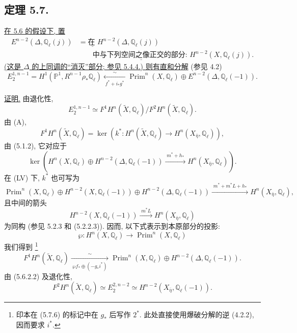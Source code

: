 \subsection*{定理 5.7.}
\underline{在 5.6 的假设下, 置}
\[
\begin{aligned}
E^{n-2}(\Delta,\mathbb Q_\ell(j))
&=\underline{\text{在 }}
H^{n-2}(\Delta,\mathbb Q_\ell(j))\\
&\qquad\underline{\text{中与下列空间之像正交的部分: }}
H^{n-2}(X,\mathbb Q_\ell(j)).
\end{aligned}
\]
\underline{(这是 $\Delta$ 的上同调的\textquotedblleft 消灭\textquotedblright{}部分; 参见 5.4.4.) 则有直和分解} (参见 4.2)
\begin{equation}\tag{5.7.1}
E_2^{1,n-1}
=H^1(\mathbb P^1,R^{n-1}\rho_*\mathbb Q_\ell)
\xleftarrow[\;f^*+i_*g^*\;]{\sim}
\operatorname{Prim}^n(X,\mathbb Q_\ell)
\oplus E^{n-2}(\Delta,\mathbb Q_\ell(-1)).
\end{equation}

\underline{证明.}
由退化性,
\[
E_2^{1,n-1}\simeq
F^1H^n(\widetilde X,\mathbb Q_\ell)
\big/F^2H^n(\widetilde X,\mathbb Q_\ell).
\]
由 (A),
\begin{equation}\tag{5.7.2}
F^1H^n(\widetilde X,\mathbb Q_\ell)
=\ker\!\left(
k^*:H^n(\widetilde X,\mathbb Q_\ell)\longrightarrow
H^n(X_{\bar\eta},\mathbb Q_\ell)
\right),
\end{equation}
由 (5.1.2), 它对应于
\[
\ker\!\left(
H^n(X,\mathbb Q_\ell)
\oplus H^{n-2}(\Delta,\mathbb Q_\ell(-1))
\xrightarrow{\;m^*+h_*\;}
H^n(X_{\bar\eta},\mathbb Q_\ell)
\right).
\]
在 (LV) 下, $k^*$ 也可写为
\begin{equation}\tag{5.7.3}
\operatorname{Prim}^n(X,\mathbb Q_\ell)
\oplus H^{n-2}(X,\mathbb Q_\ell(-1))
\oplus H^{n-2}(\Delta,\mathbb Q_\ell(-1))
\xrightarrow{\;m^*+m^*L+h_*\;}
H^n(X_{\bar\eta},\mathbb Q_\ell),
\end{equation}
且中间的箭头
\begin{equation}\tag{5.7.4}
H^{n-2}(X,\mathbb Q_\ell(-1))
\xrightarrow{\;m^*L\;}
H^n(X_{\bar\eta},\mathbb Q_\ell)
\end{equation}
为同构 (参见 5.2.3 和 (5.2.2.3)). 因而, 以下式表示到本原部分的投影:
\begin{equation}\tag{5.7.5}
\wp:H^n(X,\mathbb Q_\ell)\longrightarrow
\operatorname{Prim}^n(X,\mathbb Q_\ell)
\end{equation}
我们得到
\footnote{印本在 (5.7.6) 的标记中在 $g_*$ 后写作 $2^*$. 此处直接使用爆破分解的逆 (4.2.2), 因而要求 $i^*$.}
\begin{equation}\tag{5.7.6}
F^1H^n(\widetilde X,\mathbb Q_\ell)
\xrightarrow[\;\wp f_*\oplus(-g_*i^*)\;]{\sim}
\operatorname{Prim}^n(X,\mathbb Q_\ell)
\oplus H^{n-2}(\Delta,\mathbb Q_\ell(-1)).
\end{equation}
由 (5.6.2.2) 及退化性,
\begin{equation}\tag{5.7.7}
F^2H^n(\widetilde X,\mathbb Q_\ell)
\simeq E_2^{2,n-2}
\simeq H^{n-2}(X_{\bar\eta},\mathbb Q_\ell(-1)).
\end{equation}

